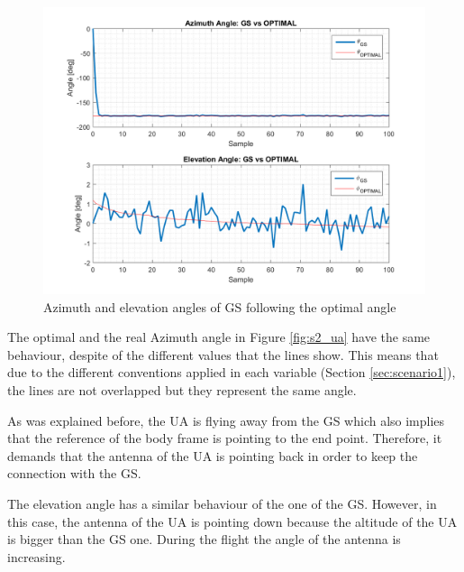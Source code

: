 \begin{figure}[H]
	\centering
	\includegraphics[scale=0.8]{figures/s2_gs.png}
	\caption{Azimuth and elevation angles of GS following the optimal angle}
	\label{fig:s2_gs}
\end{figure}

The optimal and the real Azimuth angle in Figure \ref{fig:s2_ua} have the same behaviour, despite of the different values that the lines show. This means that due to the different conventions applied in each variable (Section \ref{sec:scenario1}), the lines are not overlapped but they represent the same angle.

As was explained before, the UA is flying away from the GS which also implies that the reference of the body frame is pointing to the end point. Therefore, it demands that the antenna of the UA is pointing back in order to keep the connection with the GS. 

The elevation angle has a similar behaviour of the one of the GS. However, in this case, the antenna of the UA is pointing down because the altitude of the UA is bigger than the GS one. During the flight the angle of the antenna is increasing.


